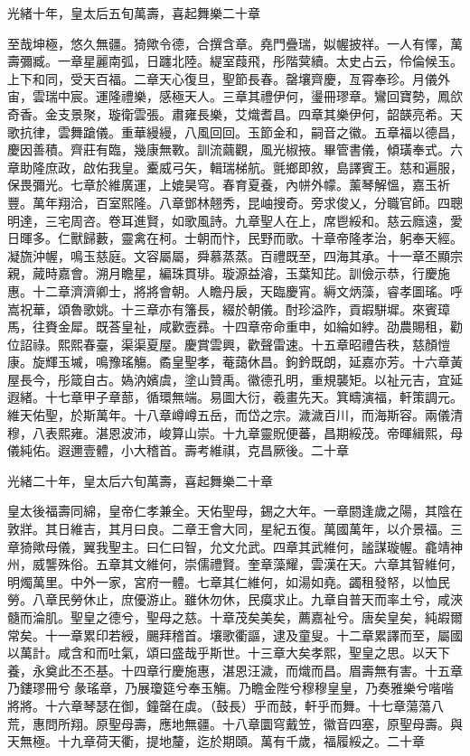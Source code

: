 \begin{pinyinscope}
光緒十年，皇太后五旬萬壽，喜起舞樂二十章

至哉坤極，悠久無疆。猗歟令德，合撰含章。堯門疊瑞，姒幄披祥。一人有懌，萬壽彌臧。一章星麗南弧，日躔北陸。緹室葭飛，彤階蓂續。太史占云，伶倫候玉。上下和同，受天百福。二章天心復旦，聖節長春。罄壤齊慶，亙霄奉珍。月儀外宙，雲瑞中宸。運隆禮樂，感極天人。三章其禮伊何，璗冊璆章。鸞回寶勢，鳳欱奇香。金支景聚，璇衛雲張。肅雍長樂，艾熾耆昌。四章其樂伊何，韶韺亮希。天歌抗律，雲舞蹌儀。重華縵縵，八風回回。玉節金和，嗣音之徽。五章福以德昌，慶因善積。齊莊有臨，幾康無斁。訓流繭觀，風光椒掖。畢管書儀，傾璜奉式。六章助隆庶政，啟佑我皇。櫜威弓矢，輯瑞梯航。氈鄉即敘，島譯賓王。慈和遍服，保畏彌光。七章於維廣運，上媲昊穹。春育夏養，內帡外幪。薰琴解慍，嘉玉祈豐。萬年翔洽，百室熙隆。八章鄧林翹秀，昆岫搜奇。旁求俊乂，分職官師。四聰明達，三宅周咨。卷耳進賢，如歌風詩。九章聖人在上，席鬯綏和。慈云廕遠，愛日暉多。仁獸歸藪，靈禽在柯。士朝而忭，民野而歌。十章帝隆孝治，躬奉天經。凝旒沖幄，鳴玉慈庭。文容屬屬，舜慕蒸蒸。百禮既至，四海其承。十一章丕顯宗親，蕆時嘉會。溯月瞻星，編珠貫琲。璇源益濬，玉葉知芘。訓儉示恭，行慶施惠。十二章濟濟卿士，將將會朝。人瞻丹扆，天臨慶宵。縟文炳藻，睿孝圖瑤。呼嵩祝華，頌魯歌姚。十三章亦有籓長，綴於朝儀。酎珍溢阼，貢嘏駢墀。來賓璋馬，往賚金犀。既荅皇祉，咸歡壼彞。十四章帝命重申，如綸如綍。劭農賜租，勸位詔祿。熙熙春臺，渠渠夏屋。慶賞雲興，歡聲雷速。十五章昭禮告秩，慈顏愷康。旋輝玉墄，鳴豫瑤觴。矞皇聖孝，菴藹休昌。鉤鈐既朗，延嘉亦芳。十六章黃屋長今，彤箴自古。媯汭嬪虞，塗山贊禹。徽德孔明，重規襲矩。以祉元吉，宜延遐緒。十七章甲子章蔀，循環無端。易圖大衍，羲畫先天。箕疇演福，軒策調元。維天佑聖，於斯萬年。十八章嶟嶟五岳，而岱之宗。濊濊百川，而海斯容。兩儀清穆，八表熙雍。湛恩波沛，峻算山崇。十九章靈貺便蕃，昌期綏茂。帝暉緝熙，母儀純佑。遐邇壹體，小大稽首。壽考維祺，克昌厥後。二十章

光緒二十年，皇太后六旬萬壽，喜起舞樂二十章

皇太後福壽同綿，皇帝仁孝兼全。天佑聖母，錫之大年。一章閼逢歲之陽，其陰在敦牂。其日維吉，其月曰良。二章王會大同，星紀五復。萬國萬年，以介景福。三章猗歟母儀，翼我聖主。曰仁曰智，允文允武。四章其武維何，謐謀璇幄。龕靖神州，威讋殊俗。五章其文維何，崇儒禮賢。奎章藻耀，雲漢在天。六章其智維何，明燭萬里。中外一家，宮府一體。七章其仁維何，如湯如堯。蠲租發帑，以恤民勞。八章民勞休止，庶優游止。雖休勿休，民瘼求止。九章自普天而率土兮，咸浹髓而淪肌。聖皇之德兮，聖母之慈。十章茂矣美矣，薦嘉祉兮。唐矣皇矣，純嘏爾常矣。十一章累印若綬，颺拜稽首。壤歌衢謳，逮及童叟。十二章累譯而至，屬國以萬計。咸含和而吐氣，頌曰盛哉乎斯世。十三章大矣孝熙，聖皇之思。以天下養，永奠此丕丕基。十四章行慶施惠，湛恩汪濊，而熾而昌。眉壽無有害。十五章乃鏤璆冊兮彖瑤章，乃展瓊筵兮奉玉觴。乃瞻金陛兮穆穆皇皇，乃奏雅樂兮喈喈將將。十六章琴瑟在御，鐘罄在虡。（鼓長）乎而鼓，軒乎而舞。十七章蕩蕩八荒，惠問所翔。原聖母壽，應地無疆。十八章圜穹戴笠，徽音四塞，原聖母壽。與天無極。十九章荷天衢，提地釐，迄於期頤。萬有千歲，福履綏之。二十章


\end{pinyinscope}
